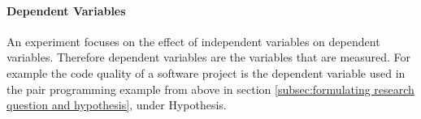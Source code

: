 
\paragraph{Dependent Variables}

An experiment focuses on the effect of independent variables on dependent variables. Therefore dependent variables are the variables that are measured. For example the code quality of a software project is the dependent variable used in the pair programming example from above in section \ref{subsec:formulating research question and hypothesis}, under Hypothesis.

